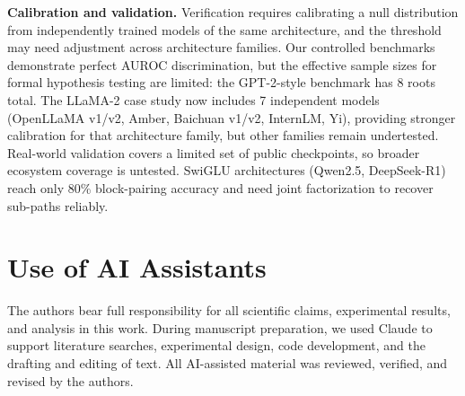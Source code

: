 \textbf{Calibration and validation.} Verification requires calibrating a null distribution from independently trained models of the same architecture, and the threshold may need adjustment across architecture families. Our controlled benchmarks demonstrate perfect AUROC discrimination, but the effective sample sizes for formal hypothesis testing are limited: the GPT-2-style benchmark has 8 roots total. The LLaMA-2 case study now includes 7 independent models (OpenLLaMA v1/v2, Amber, Baichuan v1/v2, InternLM, Yi), providing stronger calibration for that architecture family, but other families remain undertested. Real-world validation covers a limited set of public checkpoints, so broader ecosystem coverage is untested. SwiGLU architectures (Qwen2.5, DeepSeek-R1) reach only 80\% block-pairing accuracy and need joint factorization to recover sub-paths reliably.

\section*{Use of AI Assistants}

The authors bear full responsibility for all scientific claims, experimental results, and analysis in this work. During manuscript preparation, we used Claude to support literature searches, experimental design, code development, and the drafting and editing of text. All AI-assisted material was reviewed, verified, and revised by the authors.
